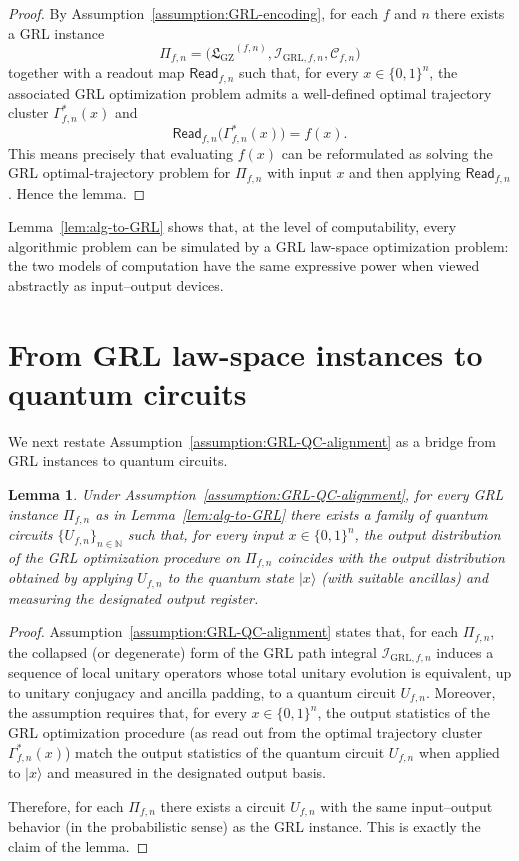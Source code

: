 \documentclass[11pt]{book}
\newcommand{\GZLS}{\ensuremath{\mathfrak{L}_{\mathrm{GZ}}}}
\theoremstyle{plain}
\newtheorem{lemma}[theorem]{Lemma}
\theoremstyle{definition}
\theoremstyle{remark}
\begin{document}
\begin{proof}
By Assumption~\ref{assumption:GRL-encoding}, for each $f$ and $n$ there
exists a GRL instance
\[
  \Pi_{f,n}
  =
  \bigl(
    \GZLS^{(f,n)},
    \mathcal{I}_{\mathrm{GRL},f,n},
    \mathcal{C}_{f,n}
  \bigr)
\]
together with a readout map $\mathsf{Read}_{f,n}$ such that, for every
$x\in\{0,1\}^n$, the associated GRL optimization problem admits a
well-defined optimal trajectory cluster $\Gamma_{f,n}^\ast(x)$ and
\[
  \mathsf{Read}_{f,n}\bigl(\Gamma_{f,n}^\ast(x)\bigr) = f(x).
\]
This means precisely that evaluating $f(x)$ can be reformulated as
solving the GRL optimal-trajectory problem for $\Pi_{f,n}$ with input
$x$ and then applying $\mathsf{Read}_{f,n}$. Hence the lemma.
\end{proof}

Lemma~\ref{lem:alg-to-GRL} shows that, at the level of computability,
every algorithmic problem can be simulated by a GRL law-space
optimization problem: the two models of computation have the same
expressive power when viewed abstractly as input--output devices.

\section{From GRL law-space instances to quantum circuits}

We next restate Assumption~\ref{assumption:GRL-QC-alignment} as a
bridge from GRL instances to quantum circuits.

\begin{lemma}\label{lem:GRL-to-QC}
Under Assumption~\ref{assumption:GRL-QC-alignment}, for every GRL
instance $\Pi_{f,n}$ as in Lemma~\ref{lem:alg-to-GRL} there exists a
family of quantum circuits $\{U_{f,n}\}_{n\in\mathbb{N}}$ such that,
for every input $x\in\{0,1\}^n$, the output distribution of the GRL
optimization procedure on $\Pi_{f,n}$ coincides with the output
distribution obtained by applying $U_{f,n}$ to the quantum state
$|x\rangle$ (with suitable ancillas) and measuring the designated
output register.
\end{lemma}

\begin{proof}
Assumption~\ref{assumption:GRL-QC-alignment} states that, for each
$\Pi_{f,n}$, the collapsed (or degenerate) form of the GRL path
integral $\mathcal{I}_{\mathrm{GRL},f,n}$ induces a sequence of local
unitary operators whose total unitary evolution is equivalent, up to
unitary conjugacy and ancilla padding, to a quantum circuit
$U_{f,n}$. Moreover, the assumption requires that, for every
$x\in\{0,1\}^n$, the output statistics of the GRL optimization
procedure (as read out from the optimal trajectory cluster
$\Gamma_{f,n}^\ast(x)$) match the output statistics of the quantum
circuit $U_{f,n}$ when applied to $|x\rangle$ and measured in the
designated output basis.

Therefore, for each $\Pi_{f,n}$ there exists a circuit $U_{f,n}$ with
the same input--output behavior (in the probabilistic sense) as the
GRL instance. This is exactly the claim of the lemma.
\end{proof}
\end{document}
